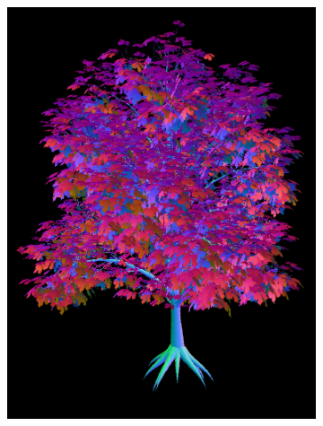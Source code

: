 \begin{figure}[ht]
    \centering
    \begin{subfigure}[b]{0.3\linewidth}
        \centering
        \includegraphics[width=1\linewidth]{img/normal_map_mesh.png}
        \caption{}
    \end{subfigure}
    \begin{subfigure}[b]{0.3\linewidth}
        \centering

\end{subfigure}
\end{figure}
